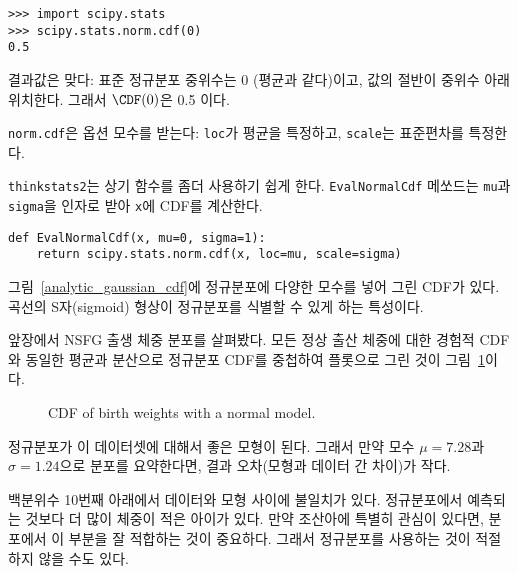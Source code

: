 
\begin{verbatim}
>>> import scipy.stats
>>> scipy.stats.norm.cdf(0)
0.5
\end{verbatim}

결과값은 맞다: 표준 정규분포 중위수는 0 (평균과 같다)이고, 값의 절반이 중위수 아래 위치한다.
그래서 $\CDF(0)$은 0.5 이다.

{\tt norm.cdf}은 옵션 모수를 받는다: {\tt loc}가
평균을 특정하고, {\tt scale}는 표준편차를 특정한다.


{\tt thinkstats2}는 상기 함수를 좀더 사용하기 쉽게 한다.
{\tt EvalNormalCdf} 메쏘드는 {\tt mu}과 {\tt sigma}을 인자로 받아 
{\tt x}에 CDF를 계산한다.


\begin{verbatim}
def EvalNormalCdf(x, mu=0, sigma=1):
    return scipy.stats.norm.cdf(x, loc=mu, scale=sigma)
\end{verbatim}

그림~\ref{analytic_gaussian_cdf}에 정규분포에 다양한 모수를 넣어 그린 CDF가 있다.
곡선의 S자(sigmoid) 형상이 정규분포를 식별할 수 있게 하는 특성이다.

앞장에서 NSFG 출생 체중 분포를 살펴봤다.
모든 정상 출산 체중에 대한 경험적 CDF와 동일한 평균과 분산으로 정규분포 CDF를 중첩하여 
플롯으로 그린 것이 그림~\ref{analytic_birthwgt_model}이다.


\begin{figure}
\caption{CDF of birth weights with a normal model.}
\label{analytic_birthwgt_model}
\end{figure}

정규분포가 이 데이터셋에 대해서 좋은 모형이 된다.
그래서 만약 모수 $\mu = 7.28$과 $\sigma = 1.24$으로 
분포를 요약한다면, 결과 오차(모형과 데이터 간 차이)가 작다.


백분위수 10번째 아래에서 데이터와 모형 사이에 불일치가 있다.
정규분포에서 예측되는 것보다 더 많이 체중이 적은 아이가 있다.
만약 조산아에 특별히 관심이 있다면, 분포에서 이 부분을 잘 적합하는 것이 중요하다.
그래서 정규분포를 사용하는 것이 적절하지 않을 수도 있다.


